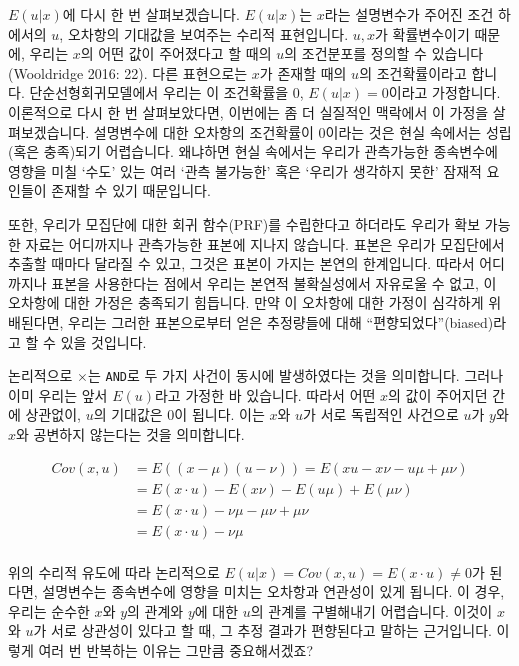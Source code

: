 \documentclass[
]{book}
\begin{document}
\(E(u|x)\)에 다시 한 번 살펴보겠습니다. \(E(u|x)\)는 \(x\)라는 설명변수가 주어진 조건 하에서의 \(u\), 오차항의 기대값을 보여주는 수리적 표현입니다. \(u, x\)가 확률변수이기 때문에, 우리는 \(x\)의 어떤 값이 주어졌다고 할 때의 \(u\)의 조건분포를 정의할 수 있습니다 (Wooldridge 2016: 22). 다른 표현으로는 \(x\)가 존재할 때의 \(u\)의 조건확률이라고 합니다. 단순선형회귀모델에서 우리는 이 조건확률을 0, \(E(u|x)=0\)이라고 가정합니다.
이론적으로 다시 한 번 살펴보았다면, 이번에는 좀 더 실질적인 맥락에서 이 가정을 살펴보겠습니다. 설명변수에 대한 오차항의 조건확률이 0이라는 것은 현실 속에서는 성립(혹은 충족)되기 어렵습니다. 왜냐하면 현실 속에서는 우리가 관측가능한 종속변수에 영향을 미칠 `수도' 있는 여러 `관측 불가능한' 혹은 `우리가 생각하지 못한' 잠재적 요인들이 존재할 수 있기 때문입니다.

또한, 우리가 모집단에 대한 회귀 함수(PRF)를 수립한다고 하더라도 우리가 확보 가능한 자료는 어디까지나 관측가능한 표본에 지나지 않습니다. 표본은 우리가 모집단에서 추출할 때마다 달라질 수 있고, 그것은 표본이 가지는 본연의 한계입니다. 따라서 어디까지나 표본을 사용한다는 점에서 우리는 본연적 불확실성에서 자유로울 수 없고, 이 오차항에 대한 가정은 충족되기 힘듭니다. 만약 이 오차항에 대한 가정이 심각하게 위배된다면, 우리는 그러한 표본으로부터 얻은 추정량들에 대해 ``편향되었다''(biased)라고 할 수 있을 것입니다.

논리적으로 \(\times\)는 \texttt{AND}로 두 가지 사건이 동시에 발생하였다는 것을 의미합니다. 그러나 이미 우리는 앞서 \(E(u)\)라고 가정한 바 있습니다. 따라서 어떤 \(x\)의 값이 주어지던 간에 상관없이, \(u\)의 기대값은 0이 됩니다. 이는 \(x\)와 \(u\)가 서로 독립적인 사건으로 \(u\)가 \(y\)와 \(x\)와 공변하지 않는다는 것을 의미합니다.

\begin{equation*}
\begin{aligned}
  Cov(x, u)& = E((x-\mu)(u-\nu)) = E(xu - x\nu - u\mu + \mu\nu)\\
  & = E(x\cdot u) - E(x\nu) - E(u\mu) + E(\mu\nu)\\
  & = E(x\cdot u) - \nu\mu - \mu\nu + \mu\nu\\
  & = E(x\cdot u) - \nu\mu\\
\end{aligned}
\end{equation*}

위의 수리적 유도에 따라 논리적으로 \(E(u|x)=Cov(x,u)=E(x\cdot u)\neq 0\)가 된다면, 설명변수는 종속변수에 영향을 미치는 오차항과 연관성이 있게 됩니다. 이 경우, 우리는 순수한 \(x\)와 \(y\)의 관계와 \(y\)에 대한 \(u\)의 관계를 구별해내기 어렵습니다. 이것이 \(x\)와 \(u\)가 서로 상관성이 있다고 할 때, 그 추정 결과가 편향된다고 말하는 근거입니다. 이렇게 여러 번 반복하는 이유는 그만큼 중요해서겠죠?
\end{document}
